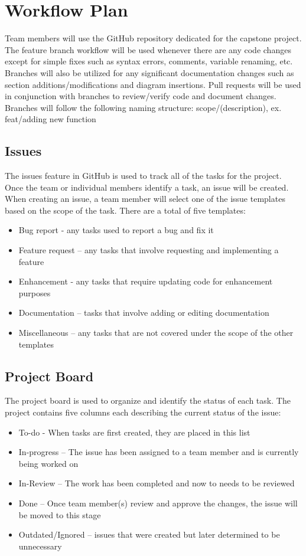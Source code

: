 \documentclass{article}
\begin{document}
\section{Workflow Plan}
Team members will use the GitHub repository dedicated for the capstone project. The feature
branch workflow will be used whenever there are any code changes except for simple fixes such as syntax errors, comments, variable renaming, etc. 
Branches will also be utilized for any significant documentation changes such as section additions/modifications and diagram insertions. 
Pull requests will be used in conjunction with branches to review/verify code and document changes.
Branches will follow the following naming structure: scope/(description), ex. feat/adding new function

\subsection{Issues}
The issues feature in GitHub is used to track all of the tasks for the project. Once the team or individual members 
identify a task, an issue will be created. When creating an issue, a team member will select one of the issue templates 
based on the scope of the task. There are a total of five templates:

\begin{itemize}
	\item Bug report - any tasks used to report a bug and fix it
	\item Feature request – any tasks that involve requesting and implementing a feature
	\item Enhancement - any tasks that require updating code for enhancement purposes
	\item Documentation – tasks that involve adding or editing documentation
	\item Miscellaneous – any tasks that are not covered under the scope of the other templates
\end{itemize}

\subsection{Project Board}
The project board is used to organize and identify the status of each task. 
The project contains five columns each describing the current status of the issue:

\begin{itemize}
	\item To-do - When tasks are first created, they are placed in this list
	\item In-progress – The issue has been assigned to a team member and is currently being worked on
	\item In-Review – The work has been completed and now to needs to be reviewed
	\item Done – Once team member(s) review and approve the changes, the issue will be moved to this stage
	\item Outdated/Ignored – issues that were created but later determined to be unnecessary 
\end{itemize}
\end{document}
